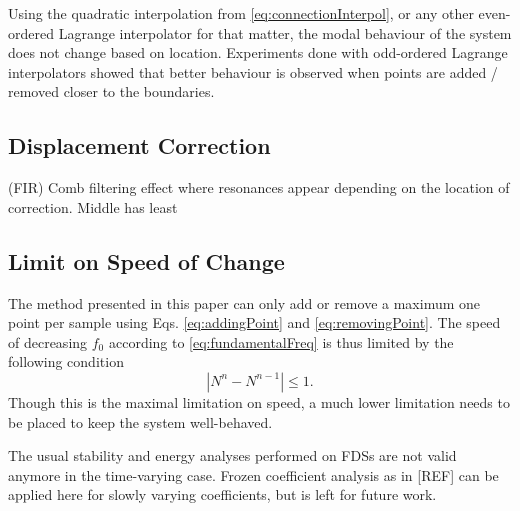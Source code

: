 Using the quadratic interpolation from \eqref{eq:connectionInterpol}, or any other even-ordered Lagrange interpolator for that matter, the modal behaviour of the system does not change based on location. Experiments done with odd-ordered Lagrange interpolators showed that better behaviour is observed when points are added / removed closer to the boundaries. 

\subsection{Displacement Correction}\label{sec:dispCorrRes}
(FIR) Comb filtering effect where resonances appear depending on the location of correction. Middle has least

\subsection{Limit on Speed of Change}
The method presented in this paper can only add or remove a maximum one point per sample using Eqs. \eqref{eq:addingPoint} and \eqref{eq:removingPoint}. The speed of decreasing $f_0$ according to \eqref{eq:fundamentalFreq} is thus limited by the following condition
\begin{equation}\label{eq:pointCondition}
    |N^n - N^{n-1}| \leq 1. 
\end{equation}
Though this is the maximal limitation on speed, a much lower limitation needs to be placed to keep the system well-behaved.  

The usual stability and energy analyses performed on FDSs are not valid anymore in the time-varying case. Frozen coefficient analysis as in [REF] can be applied here for slowly varying coefficients, but is left for future work. 

